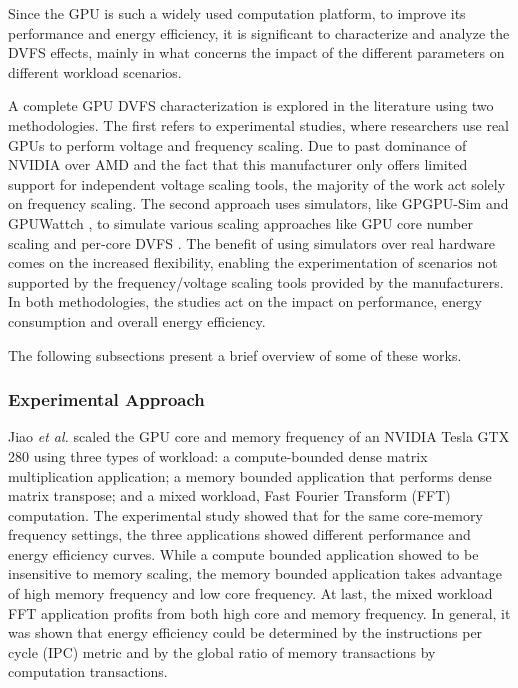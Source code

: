 Since the GPU is such a widely used computation platform, to improve its performance and energy efficiency, it is significant to characterize and analyze the DVFS effects, mainly in what concerns the impact of the different parameters on different workload scenarios. 

A complete GPU DVFS characterization is explored in the literature using two methodologies. The first refers to experimental studies, where researchers use real GPUs to perform voltage and frequency scaling. Due to past dominance of NVIDIA over AMD \cite{noauthor_jon_2018} \cite{mujtaba_amd_2019} and the fact that this manufacturer only offers limited support for independent voltage scaling tools, the majority of the work act solely on frequency scaling. The second approach uses simulators, like GPGPU-Sim \cite{noauthor_gpgpu-sim/gpgpu-sim_distribution_2019} and GPUWattch \cite{noauthor_gpu_2011} \cite{leng_gpuwattch:_2013},  to simulate various scaling approaches like GPU core number scaling and per-core DVFS \cite{mei_survey_2016}. The benefit of using simulators over real hardware comes on the increased flexibility, enabling the experimentation of scenarios not supported by the frequency/voltage scaling tools provided by the manufacturers. In both methodologies, the studies act on the impact on performance, energy consumption and overall energy efficiency.

The following subsections present a brief overview of some of these works.


\subsubsection{Experimental Approach}

Jiao \textit{et al.} \cite{jiao_power_2010} scaled the GPU core and memory frequency of an NVIDIA Tesla GTX 280 using three types of workload: a compute-bounded dense matrix multiplication application; a memory bounded application that performs dense matrix transpose; and a mixed workload, Fast Fourier Transform (FFT) computation. The experimental study showed that for the same core-memory frequency settings, the three applications showed different performance and energy efficiency curves. While a compute bounded application showed to be insensitive to memory scaling, the memory bounded application takes advantage of high memory frequency and low core frequency. At last, the mixed workload FFT application profits from both high core and memory frequency. In general, it was shown that energy efficiency could be determined by the instructions per cycle (IPC) metric and by the global ratio of memory transactions by computation transactions.

